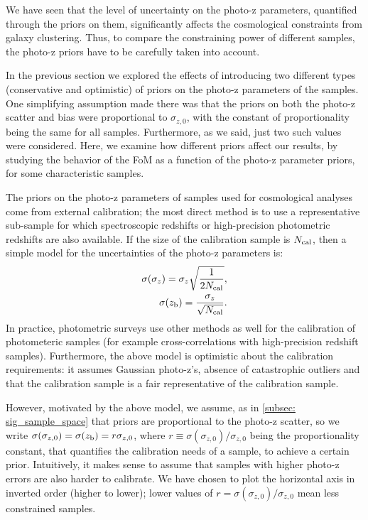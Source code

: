 \documentclass[a4paper,fleqn,usenatbib]{mnras}
\begin{document}
We have seen that the level of uncertainty on the photo-z parameters, quantified through the priors on them, significantly affects the cosmological constraints from galaxy clustering. Thus, to compare the constraining power of different samples, the photo-z priors have to be carefully taken into account.

In the previous section we explored the effects of introducing two different types (conservative and optimistic) of priors on the photo-z parameters of the samples. One simplifying assumption made there was that the priors on both the photo-z scatter and bias were proportional to $\sigma_{z,0}$, with the constant of proportionality being the same for all samples. Furthermore, as we said, just two such values were considered. Here, we examine how different priors affect our results, by studying the behavior of the FoM  as a function of the photo-z parameter priors, for some characteristic samples.

The priors on the photo-z parameters of samples used for cosmological analyses come from external calibration; the most direct method is to use a representative sub-sample for which spectroscopic redshifts or high-precision photometric redshifts are also available. If the size of the calibration sample is $N_{\mbox{\scriptsize{cal}}}$, then a simple model for the uncertainties of the photo-z parameters is:
\begin{eqnarray}
\label{eq: simple_prior_model}
\sigma(\sigma_z) = \sigma_z \sqrt{\frac{1}{2N_{\mbox{\scriptsize{cal}}}}},\\
\sigma(z_{\mbox{\scriptsize{b}}}) = \frac{\sigma_z}{\sqrt{N_{\mbox{\scriptsize{cal}}}}}.
\end{eqnarray}
In practice, photometric surveys use other methods as well for the calibration of photometeric samples (for example cross-correlations with high-precision redshift samples). Furthermore, the above model is optimistic about the calibration requirements: it assumes Gaussian photo-z's, absence of catastrophic outliers and that the calibration sample is a fair representative of the calibration sample.

However, motivated by the above model, we assume, as in \ref{subsec: sig_sample_space} that priors are proportional to the photo-z scatter, so we write $\sigma(\sigma_{z,0}) = \sigma(z_{\mbox{\scriptsize{b}}}) = r  \sigma_{z,0}$, where $r \equiv \sigma(\sigma_{z,0})/\sigma_{z,0}$  being the proportionality constant, that quantifies the calibration needs of a sample, to achieve a certain prior. Intuitively, it makes sense to assume that samples with higher photo-z errors are also harder to calibrate. We  have chosen to plot the horizontal axis  in inverted order (higher to lower); lower values of $r = \sigma(\sigma_{z,0})/\sigma_{z,0}$ mean less constrained samples. 
\end{document}
